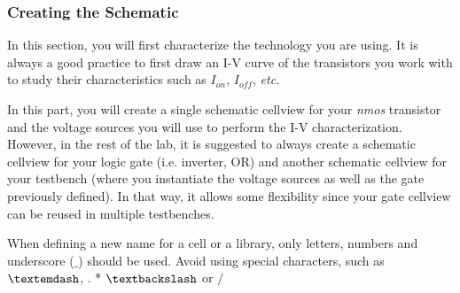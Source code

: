 \subsubsection{Creating the Schematic}
In this section, you will first characterize the technology you are using. It is always a good practice to first draw an I-V curve of the transistors you work with to study their characteristics such as $I_{on}$, $I_{off}$, \textit{etc}.
\begin{remark}
	In this part, you will create a single schematic cellview for your \textit{nmos} transistor and the voltage sources you will use to perform the I-V characterization. However, in the rest of the lab, it is suggested to always create a schematic cellview for your logic gate (i.e. inverter, OR) and another schematic cellview for your testbench (where you instantiate the voltage sources as well as the gate previously defined). In that way, it allows some flexibility since your gate cellview can be reused in multiple testbenches. 
\end{remark}	
\begin{warning}
When defining a new name for a cell or a library, only letters, numbers and underscore ($\_$) should be used. Avoid using special characters, such as $\textemdash$, . * $\textbackslash$ or $\slash$
\end{warning}





